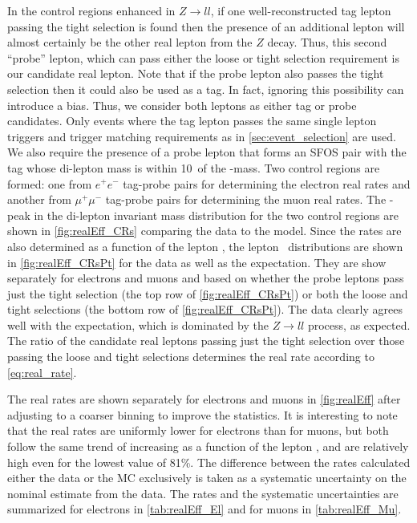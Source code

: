 In the control regions enhanced
in $Z\rightarrow ll$, if one well-reconstructed 
tag lepton passing the tight selection is found then the presence
of an additional lepton will almost certainly be the other real
lepton from the $Z$ decay. Thus, this second ``probe''
lepton, which can pass either the loose or tight selection
requirement is our candidate real lepton.
Note that if the probe lepton also passes the tight selection
then it could also be used as a tag. In fact, ignoring
this possibility can introduce a bias. Thus, we consider both 
leptons as either tag or probe candidates.
Only events where 
the tag lepton passes the same single lepton triggers and trigger
matching requirements as in \sec\ref{sec:event_selection} are used. 
We also require the presence of a 
probe lepton that forms an SFOS pair with the
tag whose di-lepton mass is within 10~\GeV of the \z-mass.
Two control regions are formed: one from $e^{+}e^{-}$ tag-probe
pairs for determining the electron real rates and another
from $\mu^{+}\mu^{-}$ tag-probe pairs for determining the muon
real rates. The \z-peak in the 
di-lepton invariant mass distribution for the two control regions
are shown in \fig\ref{fig:realEff_CRs} comparing the data
to the model.
Since the rates are also determined as a function of the lepton
\pt, the lepton \pt~distributions are shown in 
\fig\ref{fig:realEff_CRsPt}
for the data as well as the expectation.
They are show separately for electrons
and muons and based on whether the probe leptons
pass just the tight selection 
(the top row of \fig\ref{fig:realEff_CRsPt})
or both the loose and tight selections
(the bottom row of \fig\ref{fig:realEff_CRsPt}).
The data clearly agrees well with the expectation, which is dominated
by the $Z\rightarrow ll$ process, as expected. The ratio of the 
candidate real leptons passing just the tight selection 
over those passing the loose and tight selections 
determines the real rate according to \eqn\eqref{eq:real_rate}.

The real rates are shown separately for electrons and muons 
in \fig\ref{fig:realEff} after adjusting to a coarser binning
to improve the statistics. 
It is interesting to note that the real rates
are uniformly lower for electrons than for muons, but both follow
the same trend of increasing as a function of the lepton \pt, 
and are relatively high even for the lowest value of 81\%.
The difference between the rates calculated 
either the data or the MC exclusively 
is taken as a systematic uncertainty on the nominal estimate
from the data. 
The rates and the systematic uncertainties
are summarized for electrons
in \tab\ref{tab:realEff_El} and for muons in \tab\ref{tab:realEff_Mu}.




